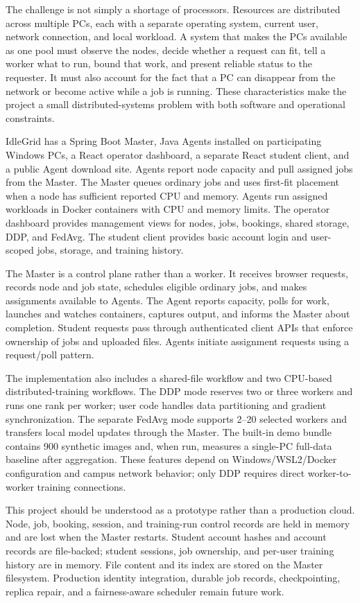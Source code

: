 \documentclass{article}
\begin{document}
The challenge is not simply a shortage of processors. Resources are distributed across multiple PCs, each with a separate operating system, current user, network connection, and local workload. A system that makes the PCs available as one pool must observe the nodes, decide whether a request can fit, tell a worker what to run, bound that work, and present reliable status to the requester. It must also account for the fact that a PC can disappear from the network or become active while a job is running. These characteristics make the project a small distributed-systems problem with both software and operational constraints.

IdleGrid has a Spring Boot Master, Java Agents installed on participating Windows PCs, a React operator dashboard, a separate React student client, and a public Agent download site. Agents report node capacity and pull assigned jobs from the Master. The Master queues ordinary jobs and uses first-fit placement when a node has sufficient reported CPU and memory. Agents run assigned workloads in Docker containers with CPU and memory limits. The operator dashboard provides management views for nodes, jobs, bookings, shared storage, DDP, and FedAvg. The student client provides basic account login and user-scoped jobs, storage, and training history.

The Master is a control plane rather than a worker. It receives browser requests, records node and job state, schedules eligible ordinary jobs, and makes assignments available to Agents. The Agent reports capacity, polls for work, launches and watches containers, captures output, and informs the Master about completion. Student requests pass through authenticated client APIs that enforce ownership of jobs and uploaded files. Agents initiate assignment requests using a request/poll pattern.

The implementation also includes a shared-file workflow and two CPU-based distributed-training workflows. The DDP mode reserves two or three workers and runs one rank per worker; user code handles data partitioning and gradient synchronization. The separate FedAvg mode supports 2--20 selected workers and transfers local model updates through the Master. The built-in demo bundle contains 900 synthetic images and, when run, measures a single-PC full-data baseline after aggregation. These features depend on Windows/WSL2/Docker configuration and campus network behavior; only DDP requires direct worker-to-worker training connections.

This project should be understood as a prototype rather than a production cloud. Node, job, booking, session, and training-run control records are held in memory and are lost when the Master restarts. Student account hashes and account records are file-backed; student sessions, job ownership, and per-user training history are in memory. File content and its index are stored on the Master filesystem. Production identity integration, durable job records, checkpointing, replica repair, and a fairness-aware scheduler remain future work.
\end{document}
